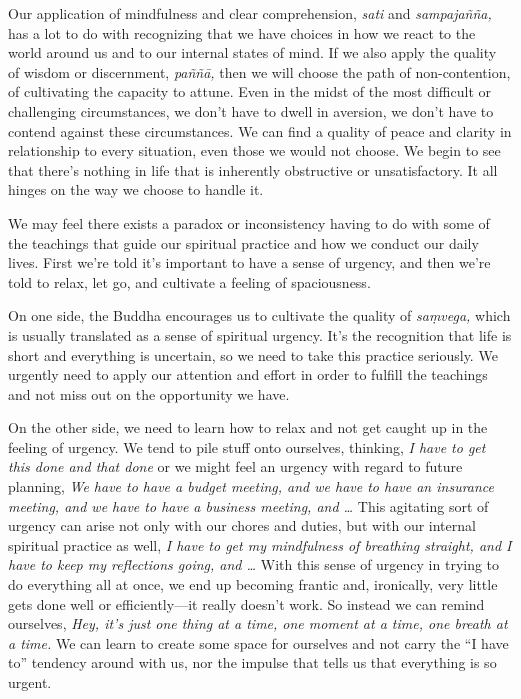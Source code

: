 Our application of mindfulness and clear comprehension, \emph{sati} and 
\emph{sampajañña,} has a lot to do with recognizing that we have 
choices in how we react to the world around us and to our internal 
states of mind. If we also apply the quality of wisdom or discernment, 
\emph{paññā,} then we will choose the path of non-contention, of 
cultivating the capacity to attune. Even in the midst of the most 
difficult or challenging circumstances, we don't have to dwell in 
aversion, we don't have to contend against these circumstances. We can 
find a quality of peace and clarity in relationship to every situation, 
even those we would not choose. We begin to see that there's nothing in 
life that is inherently obstructive or unsatisfactory. It all hinges on 
the way we choose to handle it.


We may feel there exists a paradox or inconsistency having to do with 
some of the teachings that guide our spiritual practice and how we 
conduct our daily lives. First we're told it's important to have a 
sense of urgency, and then we're told to relax, let go, and cultivate a 
feeling of spaciousness.

On one side, the Buddha encourages us to cultivate the quality of 
\emph{saṃvega,} which is usually translated as a sense of spiritual 
urgency. It's the recognition that life is short and everything is 
uncertain, so we need to take this practice seriously. We urgently need 
to apply our attention and effort in order to fulfill the teachings and 
not miss out on the opportunity we have.

On the other side, we need to learn how to relax and not get caught up 
in the feeling of urgency. We tend to pile stuff onto ourselves, 
thinking, \emph{I have to get this done and that done} or we might feel 
an urgency with regard to future planning, \emph{We have to have a 
budget meeting, and we have to have an insurance meeting, and we have 
to have a business meeting, and \ldots{}} This agitating sort of 
urgency can arise not only with our chores and duties, but with our 
internal spiritual practice as well, \emph{I have to get my mindfulness 
of breathing straight, and I have to keep my reflections going, and 
\ldots{}} With this sense of urgency in trying to do everything all at 
once, we end up becoming frantic and, ironically, very little gets done 
well or efficiently---it really doesn't work. So instead we can remind 
ourselves, \emph{Hey, it's just one thing at a time, one moment at a 
time, one breath at a time.} We can learn to create some space for 
ourselves and not carry the ``I have to'' tendency around with us, nor 
the impulse that tells us that everything is so urgent.

